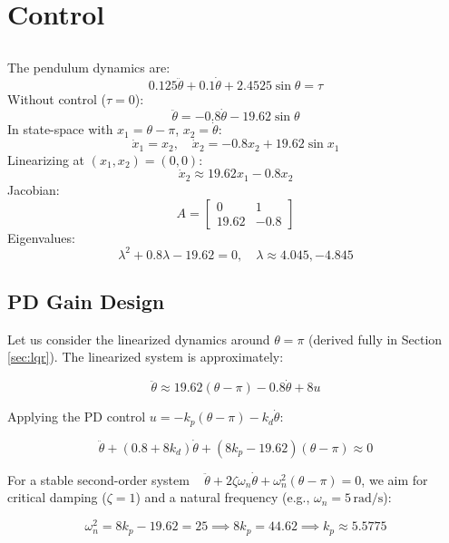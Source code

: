 \documentclass[12pt,a4paper]{article}
\begin{document}
\section{Control}

\subsection{}\label{app:upright}
The pendulum dynamics are:
\[
0.125 \ddot{\theta} + 0.1 \dot{\theta} + 2.4525 \sin \theta = \tau
\]
Without control (\(\tau = 0\)):
\[
\ddot{\theta} = -0.8 \dot{\theta} - 19.62 \sin \theta
\]
In state-space with \(x_1 = \theta - \pi\), \(x_2 = \dot{\theta}\):
\[
\dot{x}_1 = x_2, \quad \dot{x}_2 = -0.8 x_2 + 19.62 \sin x_1
\]
Linearizing at \((x_1, x_2) = (0, 0)\):
\[
\dot{x}_2 \approx 19.62 x_1 - 0.8 x_2
\]
Jacobian:
\[
A = \begin{bmatrix} 0 & 1 \\ 19.62 & -0.8 \end{bmatrix}
\]
Eigenvalues:
\[
\lambda^2 + 0.8 \lambda - 19.62 = 0, \quad \lambda \approx 4.045, -4.845
\]

\subsection{PD Gain Design}\label{app:PD}
Let us consider the linearized dynamics around \( \theta = \pi \) (derived fully in Section \ref{sec:lqr}). The linearized system is approximately:

\begin{equation}
\ddot{\theta} \approx 19.62 (\theta - \pi) - 0.8 \dot{\theta} + 8 u
\end{equation}

Applying the PD control \( u = -k_p (\theta - \pi) - k_d \dot{\theta} \):

\begin{equation}
\ddot{\theta} + (0.8 + 8 k_d) \dot{\theta} + (8 k_p - 19.62) (\theta - \pi) \approx 0
\end{equation}

For a stable second-order system ~\cite{Ogata2010} \( \ddot{\theta} + 2 \zeta \omega_n \dot{\theta} + \omega_n^2 (\theta - \pi) = 0 \), we aim for critical damping (\( \zeta = 1 \)) and a natural frequency (e.g., \( \omega_n = 5 \, \text{rad/s} \)):

\begin{equation}
\omega_n^2 = 8 k_p - 19.62 = 25 \implies 8 k_p = 44.62 \implies k_p \approx 5.5775
\end{equation}
\end{document}
